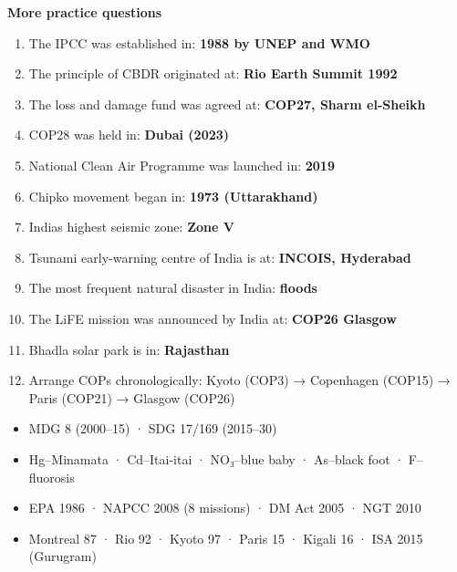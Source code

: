 \textbf{More practice questions}

\begin{enumerate}
\def\labelenumi{\arabic{enumi}.}
\setcounter{enumi}{23}
\tightlist
\item
  The IPCC was established in: \textbf{1988 by UNEP and WMO}
\item
  The principle of CBDR originated at: \textbf{Rio Earth Summit 1992}
\item
  The loss and damage fund was agreed at: \textbf{COP27, Sharm el-Sheikh}
\item
  COP28 was held in: \textbf{Dubai (2023)}
\item
  National Clean Air Programme was launched in: \textbf{2019}
\item
  Chipko movement began in: \textbf{1973 (Uttarakhand)}
\item
  India\textquotesingle s highest seismic zone: \textbf{Zone V}
\item
  Tsunami early-warning centre of India is at: \textbf{INCOIS, Hyderabad}
\item
  The most frequent natural disaster in India: \textbf{floods}
\item
  The LiFE mission was announced by India at: \textbf{COP26 Glasgow}
\item
  Bhadla solar park is in: \textbf{Rajasthan}
\item
  Arrange COPs chronologically: Kyoto (COP3) → Copenhagen (COP15) → Paris (COP21) → Glasgow (COP26)
\end{enumerate}

\begin{revbox}

\begin{itemize}
\tightlist
\item
  MDG 8 (2000--15) · SDG 17/169 (2015--30)
\item
  Hg--Minamata · Cd--Itai-itai · NO₃--blue baby · As--black foot · F--fluorosis
\item
  EPA 1986 · NAPCC 2008 (8 missions) · DM Act 2005 · NGT 2010
\item
  Montreal 87 · Rio 92 · Kyoto 97 · Paris 15 · Kigali 16 · ISA 2015 (Gurugram)
\end{itemize}

\end{revbox}
